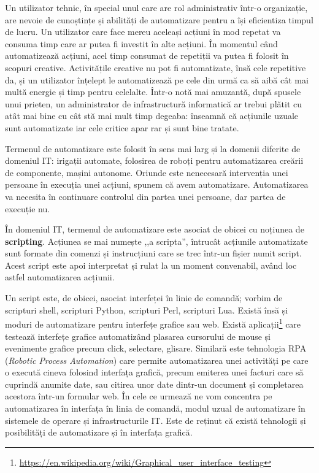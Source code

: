 Un utilizator tehnic, în special unul care are rol administrativ într-o organizație, are nevoie de cunoștințe și abilități de automatizare pentru a își eficientiza timpul de lucru.
Un utilizator care face mereu aceleași acțiuni în mod repetat va consuma timp care ar putea fi investit în alte acțiuni.
În momentul când automatizează acțiuni, acel timp consumat de repetiții va putea fi folosit în scopuri creative.
Activitățile creative nu pot fi automatizate, însă cele repetitive da, și un utilizator înțelept le automatizează pe cele din urmă ca să aibă cât mai multă energie și timp pentru celelalte.
Într-o notă mai amuzantă, după spusele unui prieten, un administrator de infrastructură informatică ar trebui plătit cu atât mai bine cu cât stă mai mult timp degeaba: înseamnă că acțiunile uzuale sunt automatizate iar cele critice apar rar și sunt bine tratate.

Termenul de automatizare este folosit în sens mai larg și la domenii diferite de domeniul IT: irigații automate, folosirea de roboți pentru automatizarea creării de componente, mașini autonome.
Oriunde este nenecesară intervenția unei persoane în execuția unei acțiuni, spunem că avem automatizare.
Automatizarea va necesita în continuare controlul din partea unei persoane, dar partea de execuție nu.

În domeniul IT, termenul de automatizare este asociat de obicei cu noțiunea de \textbf{scripting}.
Acțiunea se mai numește ,,a scripta'', întrucât acțiunile automatizate sunt formate din comenzi și instrucțiuni care se trec într-un fișier numit script.
Acest script este apoi interpretat și rulat la un moment convenabil, având loc astfel automatizarea acțiunii.

Un script este, de obicei, asociat interfeței în linie de comandă; vorbim de scripturi shell, scripturi Python, scripturi Perl, scripturi Lua.
Există însă și moduri de automatizare pentru interfețe grafice sau web.
Există aplicații\footnote{\url{https://en.wikipedia.org/wiki/Graphical\_user\_interface\_testing}} care testează interfețe grafice automatizând plasarea cursorului de mouse și evenimente grafice precum click, selectare, glisare.
Similară este tehnologia RPA (\textit{Robotic Process Automation}) care permite automatizarea unei activități pe care o execută cineva folosind interfața grafică, precum emiterea unei facturi care să cuprindă anumite date, sau citirea unor date dintr-un document și completarea acestora într-un formular web.
În cele ce urmează ne vom concentra pe automatizarea în interfața în linia de comandă, modul uzual de automatizare în sistemele de operare și infrastructurile IT.
Este de reținut că există tehnologii și posibilități de automatizare și în interfața grafică.

